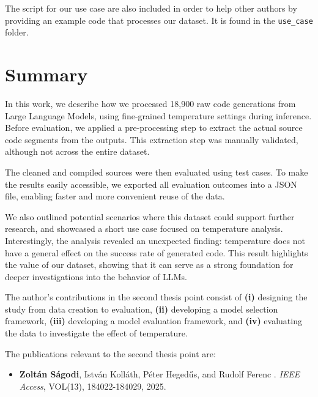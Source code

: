 The script for our use case are also included in order to help other authors by providing an example code that processes our dataset.
It is found in the \texttt{use\_case} folder.

\section{Summary}
\label{th4:sec:conclusion}

In this work, we describe how we processed 18,900 raw code generations from Large Language Models, using fine-grained temperature settings during inference.
Before evaluation, we applied a pre-processing step to extract the actual source code segments from the outputs.
This extraction step was manually validated, although not across the entire dataset.

The cleaned and compiled sources were then evaluated using test cases.
To make the results easily accessible, we exported all evaluation outcomes into a JSON file, enabling faster and more convenient reuse of the data.

We also outlined potential scenarios where this dataset could support further research, and showcased a short use case focused on temperature analysis.
Interestingly, the analysis revealed an unexpected finding: temperature does not have a general effect on the success rate of generated code.
This result highlights the value of our dataset, showing that it can serve as a strong foundation for deeper investigations into the behavior of LLMs.

\vspace*{1cm}
The author’s contributions in the second thesis point consist of \textbf{(i)} designing the study from data creation to evaluation, \textbf{(ii)} developing a model selection framework, \textbf{(iii)} developing a model evaluation framework, and \textbf{(iv)} evaluating the data to investigate the effect of temperature.

The publications relevant to the second thesis point are:
\begin{itemize}
	\item \textbf{Zoltán Ságodi}, István Kolláth, Péter Heged\H{u}s, and Rudolf Ferenc
	.
	\newblock \emph{IEEE Access}, VOL(13), 184022-184029, 2025.
\end{itemize}